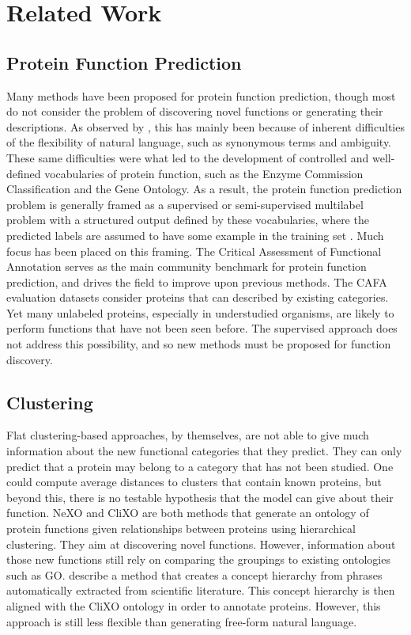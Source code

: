 \documentclass{article}
\begin{document}
    \section{Related Work}
    \subsection{Protein Function Prediction} 
    Many methods have been proposed for protein function prediction, though most do not consider the problem of discovering novel functions or generating their descriptions.
	As observed by \cite{friedberg2006automated}, this has mainly been because of inherent difficulties of the flexibility of natural language, such as synonymous terms and ambiguity. 
    These same difficulties were what led to the development of controlled and well-defined vocabularies of protein function, such as the Enzyme Commission Classification \citep{webb1992enzyme} and the Gene Ontology.
    As a result, the protein function prediction problem is generally framed as a supervised or semi-supervised multilabel problem with a structured output defined by these vocabularies, where the predicted labels are assumed to have some example in the training set \citep{bonetta2020machine}.
    Much focus has been placed on this framing. 
	The Critical Assessment of Functional Annotation \citep{CAFA3} serves as the main community benchmark for protein function prediction, and drives the field to improve upon previous methods.
	The CAFA evaluation datasets consider proteins that can described by existing categories.
    Yet many unlabeled proteins, especially in understudied organisms, are likely to perform functions that have not been seen before.
    The supervised approach does not address this possibility, and so new methods must be proposed for function discovery.
	\subsection{Clustering}
    Flat clustering-based approaches, by themselves, are not able to give much information about the new functional categories that they predict.
    They can only predict that a protein may belong to a category that has not been studied.
    One could compute average distances to clusters that contain known proteins, but beyond this, there is no testable hypothesis that the model can give about their function.
    NeXO \citep{NeXO} and CliXO \citep{CliXO} are both methods that generate an ontology of protein functions given relationships between proteins using hierarchical clustering. They aim at discovering novel functions. 
	However, information about those new functions still rely on comparing the groupings to existing ontologies such as GO. 
    \cite{wang2018annotating} describe a method that creates a concept hierarchy from phrases automatically extracted from scientific literature. This concept hierarchy is then aligned with the CliXO ontology in order to annotate proteins. However, this approach is still less flexible than generating free-form natural language.
\end{document}
